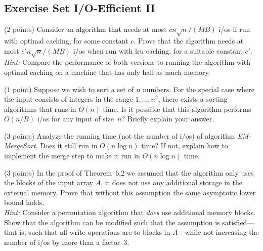 \documentclass{article}
\newcommand{\io}{{\sc i/o}\xspace}
\newcommand{\ios}{{\io}s\xspace}
\newcommand{\lru}{{\sc lru}\xspace}
\newcounter{rcounter}
\newenvironment{rlist}%
{\begin{list}{\setnr-\arabic{rcounter}}{\usecounter{rcounter}}}{\end{list}}
\begin{document}
    \subsection*{Exercise Set I/O-Efficient II}
    \begin{rlist}
        
        \item (2 points)
        Consider an algorithm that needs at most $c n\sqrt{n} / (MB)$ \ios if run with
        optimal caching, for some constant $c$. Prove that the algorithm needs at most
        $c' n\sqrt{n} / (MB)$ \ios when run with \lru caching, for a suitable constant $c'$.
        \\[2mm]
        \emph{Hint:} Compare the performance of both versions to running the algorithm with optimal
        caching on a machine that has only half as much memory.
        
        \item ($1$ point)
        Suppose we wish to sort a set of $n$ numbers.
        For the special case where the input consists of integers in the range $1,\ldots,n^2$,
        there exists a sorting algorithms that runs in $O(n)$ time.
        Is it possible that this algorithm performs $O(n/B)$ \ios for
        any input of size~$n$? Briefly explain your answer.
        
        
        
        \item (3 points)
        Analyze the running time (not the number of \ios) of algorithm \emph{EM-MergeSort}.
        Does it still run in $O(n\log n)$ time? If not, explain how to implement the
        merge step to make it run in $O(n\log n)$ time.
        
        
        \item(3 points)
        In the proof of Theorem~6.2 we assumed that the algorithm only
        uses the blocks of the input array $A$, it does not use any additional storage
        in the external memory. Prove that without this assumption the same asymptotic lower
        bound holds.
        \\[2mm]
        \emph{Hint:} Consider a permutation algorithm that \emph{does} use additional memory blocks.
        Show that the algorithm can be modified such that the assumption is satisfied---that is,
        such that all write operations are to blocks in $A$---while not increasing the number
        of \ios by more than a factor~3.
    \end{rlist}
    
\end{document}
